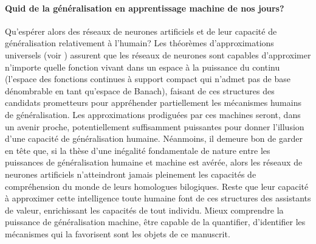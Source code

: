 \paragraph{Quid de la généralisation en apprentissage machine de nos jours?}
     Qu'espérer alors des réseaux de neurones artificiels et de leur capacité de généralisation relativement à l'humain? Les théorèmes d'approximations universels (voir \eg \citealp{lu2017expressive,park2021minimum}) assurent que les réseaux de neurones sont capables d'approximer n'importe quelle fonction vivant dans un espace à la puissance du continu (\eg l'espace des fonctions continues à support compact qui n'admet pas de base dénombrable en tant qu'espace de Banach), faisant de ces structures des candidats prometteurs pour appréhender partiellement les mécanismes humains de généralisation.
    Les approximations prodiguées par ces machines seront, dans un avenir proche, potentiellement suffisamment puissantes pour donner l'illusion d'une capacité de généralisation humaine. Néanmoins, il demeure bon de garder en tête que, si la thèse d'une inégalité fondamentale de nature entre les puissances de généralisation humaine et machine est avérée, alors les réseaux de neurones artificiels n'atteindront jamais pleinement les capacités de compréhension du monde de leurs homologues bilogiques. Reste que leur capacité à approximer cette intelligence toute humaine font de ces structures des assistants de valeur, enrichissant les capacités de tout individu.  Mieux comprendre la puissance de généralisation machine, être capable de la quantifier, d'identifier les mécanismes qui la favorisent sont les objets de ce manuscrit.  

    
    
